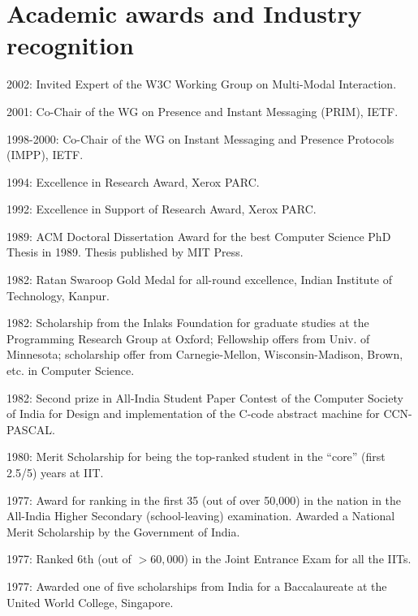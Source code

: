 \documentclass{article}
\begin{document}
\section*{Academic awards and Industry recognition}

\begin{description}

\item{2002:} Invited Expert of the W3C Working Group on Multi-Modal
Interaction.

\item{2001:} Co-Chair of the WG on Presence and Instant Messaging
(PRIM), IETF.

\item{1998-2000:} Co-Chair of the WG on Instant Messaging and
 Presence Protocols (IMPP), IETF.

\item{1994:} Excellence in Research Award, Xerox PARC.   

\item{1992:} Excellence in Support of Research Award, Xerox PARC.   

\item{1989:} ACM Doctoral Dissertation Award for the best Computer Science
   PhD Thesis in 1989. Thesis published by MIT Press.

\item{1982:} Ratan Swaroop Gold Medal for all-round excellence,
      Indian Institute of Technology, Kanpur. 

\item{1982:} Scholarship from the Inlaks Foundation for graduate studies
      at the Programming Research Group at Oxford; Fellowship
      offers from Univ. of  Minnesota; scholarship offer from 
      Carnegie-Mellon, Wisconsin-Madison, Brown, etc.  in
      Computer Science.  

\item{1982:} Second prize in All-India Student Paper Contest of the
      Computer Society of India for  Design and implementation of the
      C-code abstract machine for CCN-PASCAL. 

\item{1980:} Merit Scholarship for being the top-ranked student in the
      ``core'' (first 2.5/5) years  at IIT. 

\item{1977:}  Award for ranking in the first 35 (out of over 50,000) in 
      the nation in the All-India Higher Secondary (school-leaving)
      examination. Awarded a National Merit Scholarship by the
      Government of India. 

\item{1977:} Ranked 6th (out of $> 60,000$) in the Joint Entrance Exam
      for all the IITs.  

\item{1977:} Awarded one of five scholarships from India for
      a Baccalaureate at the United World College, Singapore.  
\end{description}
\end{document}

